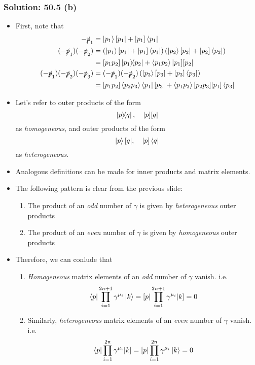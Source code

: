 \documentclass{beamer}
\begin{document}
\begin{frame}
\frametitle{Solution: 50.5 (b)}
    \begin{itemize}
        \item<only@1> First, note that
        \begin{align*}
            -\slashed{p}_1 &= \ket{p_1}[p_1| + |p_1]\bra{p_1} \\
            (-\slashed{p}_1)(-\slashed{p}_2) &= \left(\ket{p_1}[p_1| + |p_1]\bra{p_1}\right)\left(\ket{p_2}[p_2| + |p_2]\bra{p_2}\right) \\
            &= [p_1p_2]\dyad{p_1}{p_2} + \ev{p_1p_2}|p_1][p_2| \\
            (-\slashed{p}_1)(-\slashed{p}_2)(-\slashed{p}_3) &= (-\slashed{p}_1)(-\slashed{p}_2)\left(\ket{p_3}[p_3| + |p_3]\bra{p_3}\right) \\
            &= [p_1p_2]\ev{p_2p_3}\bra{p_1}[p_3| + \ev{p_1p_2}[p_2p_3]|p_1]\bra{p_3}
        \end{align*}

        \item<only@2> Let's refer to outer products of the form
        \[ \dyad{p}{q}, \quad |p][q| \]
        as \textit{homogeneous}, and outer products of the form
        \[ \ket{p}[q|, \quad |p]\bra{q} \]
        as \textit{heterogeneous}. 
        
        \item<only@2> Analogous definitions can be made for inner products and matrix elements.

        \item<only@3> The following pattern is clear from the previous slide:
        \begin{enumerate}[label=-]
            \item<only@3> The product of an \textit{odd} number of $\gamma$ is given by \textit{heterogeneous} outer products
            \item<only@3> The product of an \textit{even} number of $\gamma$ is given by \textit{homogeneous} outer products
        \end{enumerate}

        \item<only@4> Therefore, we can conlude that
        \begin{enumerate}[label=-]
            \item \textit{Homogeneous} matrix elements of an \textit{odd} number of $\gamma$ vanish. i.e.
             \[ \bra{p}\prod_{i=1}^{2n+1}\gamma^{\mu_i}\ket{k} = [p|\prod_{i=1}^{2n+1}\gamma^{\mu_i}|k] = 0 \]
            \item Similarly, \textit{heterogeneous} matrix elements of an \textit{even} number of $\gamma$ vanish. i.e.
            \[ \bra{p}\prod_{i=1}^{2n}\gamma^{\mu_i}|k] = [p|\prod_{i=1}^{2n}\gamma^{\mu_i}\ket{k} = 0 \]  
        \end{enumerate}
    \end{itemize}
\end{frame}
\end{document}
